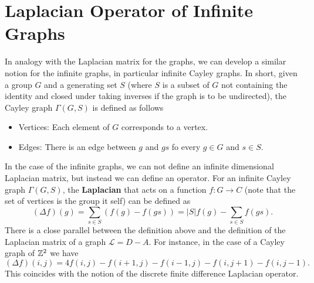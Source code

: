\documentclass[10pt,a4paper,twocolumn]{article}
\begin{document}
	\section{Laplacian Operator of Infinite Graphs}
	In analogy with the Laplacian matrix for the graphs, we can develop a similar notion for the infinite graphs, in particular infinite Cayley graphs. In short, given a group $ G $ and a generating set $ S $ (where $ S $ is a subset of $ G $ not containing the identity and closed under taking inverses if the graph is to be undirected), the Cayley graph $ \Gamma(G,S) $ is defined as follows
	\begin{itemize}
		\item Vertices: Each element of $ G $ corresponds to a vertex.
		\item Edges: There is an edge between $ g $ and $ gs $ fo every $ g\in G $ and $ s \in S $.
	\end{itemize}
	In the case of the infinite graphs, we can not define an infinite dimensional Laplacian matrix, but instead we can define an operator. For an infinite Cayley graph $ \Gamma(G,S) $, the \textbf{Laplacian} that acts on a function $ f: G \to C $ (note that the set of vertices is the group it self) can be defined as
	\[ (\Delta f)(g) = \sum_{s\in S} (f(g) - f(gs)) = |S|f(g) - \sum_{s\in S} f(gs). \]
	There is a close parallel between the definition above and the definition of the Laplacian matrix of a graph $ \mathcal{L} = D - A $. For instance, in the case of a Cayley graph of $ \mathbb{Z}^2 $ we have
	\[ (\Delta f)(i,j) = 4 f(i,j) - f(i+1,j) - f(i-1,j) - f(i,j+1) - f(i,j-1). \]
	This coincides with the notion of the discrete finite difference Laplacian operator.
	
%	
%	
\end{document}
